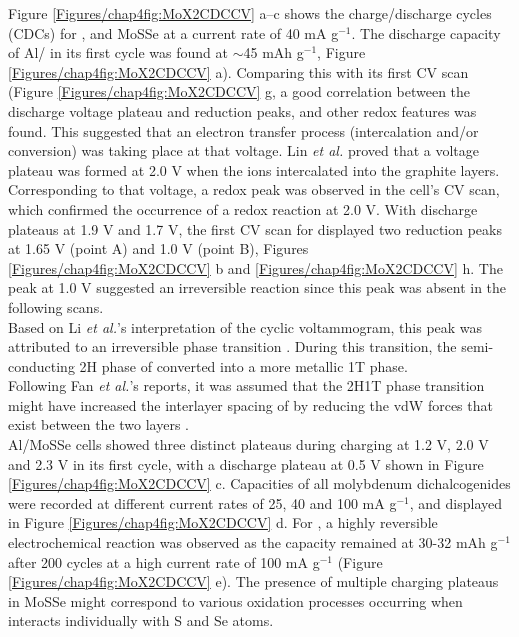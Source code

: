 Figure \ref{Figures/chap4fig:MoX2CDCCV} a--c shows the charge/discharge cycles (CDCs) for ,  and MoSSe at a current rate of 40 mA g$^{-1}$. The discharge capacity of Al/ in its first cycle was found at $\sim$45 mAh g$^{-1}$, Figure \ref{Figures/chap4fig:MoX2CDCCV} a). Comparing this with its first CV scan (Figure \ref{Figures/chap4fig:MoX2CDCCV} g, a good correlation between the discharge voltage plateau and reduction peaks, and other redox features was found. This suggested that an electron transfer process (intercalation and/or conversion) was taking place at that voltage. Lin \textit{et al.} proved that a voltage plateau was formed at 2.0 V when the  ions intercalated into the graphite layers. Corresponding to that voltage, a redox peak was observed in the cell's CV scan, which confirmed the occurrence of a redox reaction at 2.0 V. With discharge plateaus at 1.9 V and 1.7 V, the first CV scan for  displayed two reduction peaks at 1.65 V (point A) and 1.0 V (point B), Figures \ref{Figures/chap4fig:MoX2CDCCV} b and \ref{Figures/chap4fig:MoX2CDCCV} h. The peak at 1.0 V suggested an irreversible reaction since this peak was absent in the following scans. \\
Based on Li \textit{et al.}'s interpretation of the cyclic voltammogram, this peak was attributed to an irreversible phase transition \cite{li_enhancing_2015}. During this transition, the semi-conducting 2H phase of  converted into a more metallic 1T phase. \\
Following Fan \textit{et al.}'s reports, it was assumed that the 2H\ce{->}1T phase transition might have increased the interlayer spacing of  by reducing the vdW forces that exist between the two layers \cite{fan_hybrid_2017}. \\
Al/MoSSe cells showed three distinct plateaus during charging at 1.2 V, 2.0 V and 2.3 V in its first cycle, with a discharge plateau at 0.5 V shown in Figure \ref{Figures/chap4fig:MoX2CDCCV} c. Capacities of all molybdenum dichalcogenides were recorded at different current rates of 25, 40 and 100 mA g$^{-1}$, and displayed in Figure \ref{Figures/chap4fig:MoX2CDCCV} d. For , a highly reversible electrochemical reaction was observed as the capacity remained at 30-32 mAh g$^{-1}$ after 200 cycles at a high current rate of 100 mA g$^{-1}$ (Figure \ref{Figures/chap4fig:MoX2CDCCV} e). The presence of multiple charging plateaus in MoSSe might correspond to various oxidation processes occurring when  interacts individually with S and Se atoms. \\
